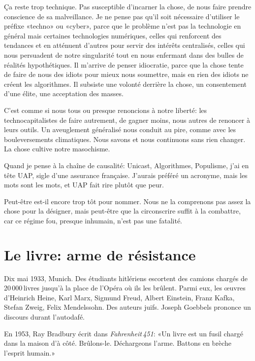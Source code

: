 \documentclass[a5paper, 10pt, twoside]{book}
\begin{document}
Ça reste trop technique. Pas susceptible d’incarner la chose, de nous
faire prendre conscience de sa malveillance. Je ne pense pas qu’il soit
nécessaire d’utiliser le préfixe «techno» ou «cyber», parce que le
problème n’est pas la technologie en général mais certaines technologies
numériques, celles qui renforcent des tendances et en atténuent d’autres
pour servir des intérêts centralisés, celles qui nous persuadent de
notre singularité tout en nous enfermant dans des bulles de réalités
hypothétiques. Il m’arrive de penser idiocratie, parce que la chose
tente de faire de nous des idiots pour mieux nous soumettre, mais en
rien des idiots ne créent les algorithmes. Il subsiste une volonté
derrière la chose, un consentement d’une élite, une acceptation des
masses.

C’est comme si nous tous ou presque renoncions à notre liberté: les
technocapitalistes de faire autrement, de gagner moins, nous autres de
renoncer à leurs outils. Un aveuglement généralisé nous conduit au pire,
comme avec les bouleversements climatiques. Nous savons et nous
continuons sans rien changer. La chose cultive notre masochisme.

Quand je pense à la chaîne de causalité: Unicast, Algorithmes,
Populisme, j’ai en tête UAP, sigle d’une assurance française. J’aurais
préféré un acronyme, mais les mots sont les mots, et UAP fait rire
plutôt que peur.

Peut-être est-il encore trop tôt pour nommer. Nous ne la comprenons pas
assez la chose pour la désigner, mais peut-être que la circonscrire
suffit à la combattre, car ce régime fou, presque inhumain, n’est pas
une fatalité.

\chapter{\texorpdfstring{Le livre: arme de
résistance}{    }}\label{le-livre-arme-de-ruxe9sistance}

Dix mai 1933, Munich. Des étudiants hitlériens escortent des camions
chargés de 20\,000\,livres jusqu’à la place de l’Opéra où ils les
brûlent. Parmi eux, les œuvres d’Heinrich Heine, Karl Marx, Sigmund
Freud, Albert Einstein, Franz Kafka, Stefan Zweig, Felix Mendelssohn.
Des auteurs juifs. Joseph Goebbels prononce un discours durant
l’autodafé.

En 1953, Ray Bradbury écrit dans \emph{Fahrenheit\,451}: «Un livre est
un fusil chargé dans la maison d’à côté. Brûlons-le. Déchargeons l’arme.
Battons en brèche l’esprit humain.»
\end{document}
